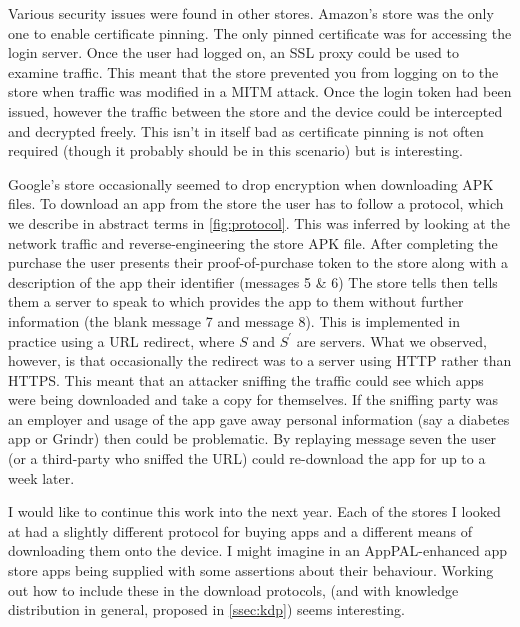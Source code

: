 \documentclass[a4paper]{scrartcl}
\begin{document}
Various security issues were found in other stores.
Amazon's store was the only one to enable certificate pinning.
The only pinned certificate was for accessing the login server.
Once the user had logged on, an SSL proxy could be used to examine traffic.
This meant that the store prevented you from logging on to the store when traffic was modified in a \ac{MITM} attack.
Once the login token had been issued, however the traffic between the store and the device could be intercepted and decrypted freely.
This isn't in itself bad as certificate pinning is not often required (though it probably should be in this scenario) but is interesting.

Google's store occasionally seemed to drop encryption when downloading APK files.
To download an app from the store the user has to follow a protocol, which we describe in abstract terms in \autoref{fig:protocol}.
This was inferred by looking at the network traffic and reverse-engineering the store APK file.
After completing the purchase the user presents their proof-of-purchase token to the store along with a description of the app their identifier (messages 5 \& 6)
The store tells then tells them a server to speak to which provides the app to them without further information (the blank message 7 and message 8).
This is implemented in practice using a URL redirect, where $S$ and $S^\prime$ are servers.
What we observed, however, is that occasionally the redirect was to a server using HTTP rather than HTTPS.
This meant that an attacker sniffing the traffic could see which apps were being downloaded and take a copy for themselves.
If the sniffing party was an employer and usage of the app gave away personal information (say a diabetes app or Grindr) then could be problematic.
By replaying message seven the user (or a third-party who sniffed the URL) could re-download the app for up to a week later.

I would like to continue this work into the next year.
Each of the stores I looked at had a slightly different protocol for buying apps and a different means of downloading them onto the device.
I might imagine in an AppPAL-enhanced app store apps being supplied with some assertions about their behaviour.
Working out how to include these in the download protocols, (and with knowledge distribution in general, proposed in \autoref{ssec:kdp}) seems interesting.
\end{document}
